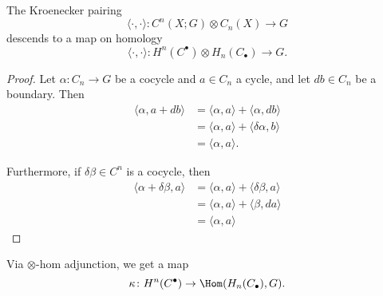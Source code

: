\documentclass[main.tex]{subfiles}
\begin{document}
\begin{lemma}
  \label{lemma:kroenecker_pairing_descends_to_homology}
  The Kroenecker pairing
  \begin{equation*}
    \langle \cdot,\cdot \rangle\colon C^{n}(X; G) \otimes C_{n}(X) \to G
  \end{equation*}
  descends to a map on homology
  \begin{equation*}
    \langle \cdot,\cdot \rangle\colon H^{n}(C^{\bullet}) \otimes H_{n}(C_{\bullet}) \to G.
  \end{equation*}
\end{lemma}
\begin{proof}
  Let $\alpha\colon C_{n} \to G$ be a cocycle and $a \in C_{n}$ a cycle, and let $d b \in C_{n}$ be a boundary. Then
  \begin{align*}
    \langle \alpha, a + db \rangle &= \langle \alpha, a \rangle + \langle \alpha, db \rangle \\
    &= \langle \alpha, a \rangle + \langle \delta \alpha, b \rangle \\
    &= \langle \alpha, a \rangle.
  \end{align*}

  Furthermore, if $\delta \beta \in C^{n}$ is a cocycle, then
  \begin{align*}
    \langle \alpha + \delta \beta, a \rangle &= \langle \alpha, a \rangle + \langle \delta \beta, a \rangle \\
    &= \langle \alpha, a \rangle + \langle \beta, d a \rangle \\
    &= \langle \alpha, a \rangle
  \end{align*}
\end{proof}

Via $\otimes$-hom adjunction, we get a map
\begin{equation*}
  \kappa\colon H^{n}(C^{\bullet}) \to \Hom(H_{n}(C_{\bullet}), G).
\end{equation*}
\end{document}
